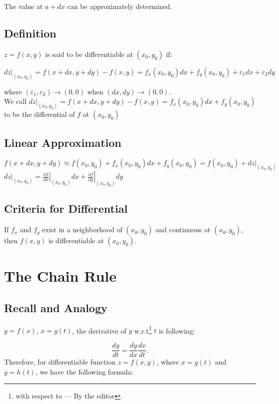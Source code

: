 The value at $a+dx$ can be approximately determined.
\subsection{Definition}
$z=f(x,y)$ is said to be differentiable at $(x_0,y_0)$ if:

\begin{center}
$dz|_{(x_0,y_0)}=f(x+dx,y+dy)-f(x,y)=f_x(x_0,y_0)dx+f_y(x_0,y_0)+\varepsilon_1dx+\varepsilon_2dy$
\end{center}

where $(\varepsilon_1,\varepsilon_2)\to (0,0)$ when $(dx,dy)\to (0,0)$.\\

We call $dz|_{(x_0,y_0)}=f(x+dx,y+dy)-f(x,y)=f_x(x_0,y_0)dx+f_y(x_0,y_0)$ to be the differential of $f$ at $(x_0,y_0)$
\subsection{Linear Approximation}
\begin{center}
$f(x+dx,y+dy)\approx f(x_0,y_0)+f_x(x_0,y_0)dx+f_y(x_0,y_0)=f(x_0,y_0)+dz|_{(x_0,y_0)}$\\
$dz|_{(x_0,y_0)}=\left. \frac{\partial f}{\partial x} \right|_{(x_0,y_0)}dx + 	\left.\frac{\partial f}{\partial y} \right|_{(x_0,y_0)}dy$
\end{center}
\subsection{Criteria for Differential}
If $f_x$ and $f_y$ exist in a neighborhood of $(x_0,y_0)$ and continuous at $(x_0,y_0)$, then $f(x,y)$ is differentiable at $(x_0,y_0)$.

\section{The Chain Rule}
\subsection{Recall and Analogy}
$y=f(x)$, $x=g(t)$, the derivative of $y$ w.r.t\footnote{with respect to --- By the editor} $t$ is following:

\[\frac{dy}{dt}=\frac{dy}{dx}\frac{dx}{dt}.\]
Therefore, for differentiable function $z=f(x,y)$, where $x=g(t)$ and $y=h(t)$, we have the following formula:

